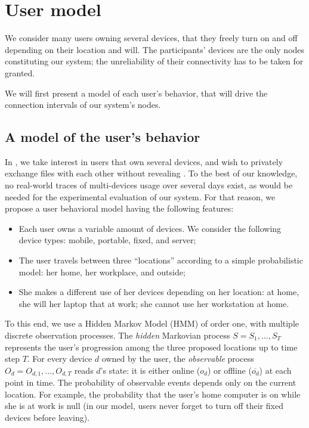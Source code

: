 \section{User model} 
\label{sec:user_model}

We consider many users owning several devices, that they freely turn on and off depending on their location and will.
The participants' devices are the only nodes constituting our system; the unreliability of their connectivity has to be taken for granted.

We will first present a model of each user's behavior, that will drive the connection intervals of our system's nodes.

\subsection{A model of the user's behavior}
\label{sub:a_model_of_the_user_s_behavior}

In \name, we take interest in users that own several devices, and wish to privately exchange files with each other without revealing .
To the best of our knowledge, no real-world traces of multi-devices usage over several days exist, as would be needed for the experimental evaluation of our system.
For that reason, we propose a user behavioral model having the following features:

\begin{itemize}
	\item Each user owns a variable amount of devices. We consider the following device types: mobile, portable, fixed, and server;
	\item The user travels between three ``locations'' according to a simple probabilistic model: her home, her workplace, and outside;
	\item She makes a different use of her devices depending on her location: at home, she will her laptop that at work; she cannot use her workstation at home.
\end{itemize}

To this end, we use a Hidden Markov Model (HMM) of order one, with multiple discrete observation processes. 
The \emph{hidden} Markovian process $S=S_1,\dots,S_T$ represents the user's progression among the three proposed locations up to time step $T$.
For every device $d$ owned by the user, the \emph{observable} process $O_d=O_{d,1},\dots,O_{d,T}$ reads $d$'s state: it is either online ($o_d$) or offline ($\overline{o_d}$) at each point in time. 
The probability of observable events depends only on the current location.
For example, the probability that the user's home computer is on while she is at work is null (in our model, users never forget to turn off their fixed devices before leaving).

